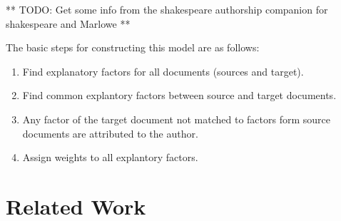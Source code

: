 \documentclass[../dissertation.tex]{subfiles}
\begin{document}
** TODO: Get some info from the shakespeare authorship companion for
shakespeare and Marlowe **

The basic steps for constructing this model are as follows:
\begin{enumerate}
    \item Find explanatory factors for all documents (sources and
        target).
    \item Find common explantory factors between source and target
        documents.  
    \item Any factor of the target document not matched to factors
        form source documents are attributed to the author.
    \item Assign weights to all explantory factors.
\end{enumerate}



\section{Related Work}
\end{document}
